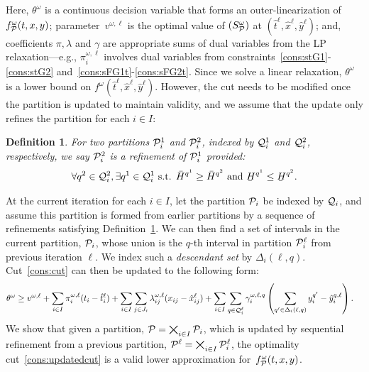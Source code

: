 \documentclass[11pt]{article}
\newtheorem{definition}{Definition}
\newcommand{\cQ}{{\cal Q}}
\newcommand{\noi}{\noindent}
\newcommand{\cP}{{\cal P}}
\renewcommand{\underbar}{\underaccent{\bar}}
\begin{document}
	Here, $\theta^\omega$ is a continuous decision variable that forms an outer-linearization of $f^\omega_{\cP}(t,x,y)$; parameter~$v^{\omega,\ell}$ is the optimal value of \((S_{\cP}^\omega)\) at $(\hat{t}^\ell,\hat{x}^\ell,\hat{y}^\ell)$; and, coefficients \(\pi,\lambda\) and \(\gamma\) are appropriate sums of dual variables from the LP relaxation---e.g., $\pi_i^{\omega,\ell}$ involves dual variables from constraints~\eqref{cons:stG1}-\eqref{cons:stG2} and~\eqref{cons:sFG1t}-\eqref{cons:sFG2t}.
	Since we solve a linear relaxation, \(\theta^\omega\) is a lower bound on \(f^\omega(\hat{t}^\ell,\hat{x}^\ell,\hat{y}^\ell)\). However, the cut needs to be modified once the partition is updated to maintain validity, and we assume that the update only refines the partition for each \(i \in I\):
	\begin{definition} \label{definition:refinement}
		For two partitions \(\cP^1_i\) and \(\cP^2_i\), indexed by \(\cQ^1_i\) and \(\cQ^2_i\), respectively, we say \(\cP^2_i\) is a {\em refinement} of \(\cP^1_i\) provided:
		\begin{equation*}
		\forall q^2 \in \cQ^2_i, \exists q^1 \in \cQ^1_i \text{ s.t. } \bar{H}^{q^1} \geq \bar{H}^{q^2} \text{ and } {\underbar{H}^{q^1} \leq \underbar{H}^{q^2}}.
		\end{equation*}
	\end{definition}
	\noi At the current iteration for each \(i \in I\), let the partition \(\cP_i\) be indexed by \(\cQ_i\), and assume this partition is formed from earlier partitions by a sequence of refinements satisfying Definition~\ref{definition:refinement}. We can then find a set of intervals in the current partition,  \(\cP_i\), whose union is the \(q\)-th interval in partition \(\cP^\ell_i\) from previous iteration \(\ell\). We index such a {\em descendant set} by \(\Delta_i(\ell,q)\). Cut~\eqref{cons:cut} can then be updated to the following form:
	\begin{align} \label{cons:updatedcut}
		& \theta^\omega \geq v^{\omega,\ell} + \sum_{i \in I} \pi_i^{\omega,\ell} (t_i - \hat{t}_i^{\ell}) + \sum_{i \in I} \sum_{j \in J_i} \lambda_{ij}^{\omega,\ell} (x_{ij} - \hat{x}_{ij}^{\ell}) + %
		\sum_{i \in I} \sum_{q \in \cQ^{\ell}_i} \gamma_{i}^{\omega,\ell,q} \left( \sum_{q^\prime \in \Delta_i(\ell,q)} y_i^{q^\prime} - \hat{y}_i^{q,\ell} \right). %
	\end{align}
	We show that given a partition, \(\cP=\bigtimes_{i \in I} \cP_i\), which is updated by sequential refinement from a previous partition, \(\cP^\ell = \bigtimes_{i \in I} \cP_i^\ell\), the optimality cut~\eqref{cons:updatedcut} is a valid lower approximation for~$f^\omega_{\cP}(t,x,y)$.
\end{document}
